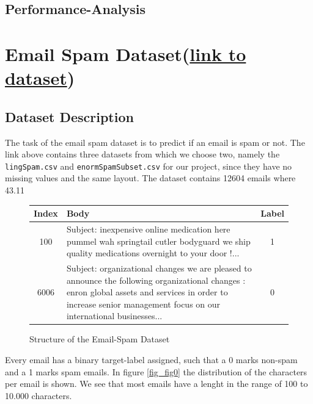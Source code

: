 \documentclass[11pt]{article}
\begin{document}
\subsection{Performance-Analysis}


\section{Email Spam Dataset(\href{https://www.kaggle.com/nitishabharathi/email-spam-dataset}{link to dataset})}


\subsection{Dataset Description}
The task of the email spam dataset is to predict if an email is spam or not. The link above contains three datasets from which we choose two, namely the \texttt{lingSpam.csv} and \texttt{enormSpamSubset.csv} for our project, since they have no missing values and the same layout. The dataset contains 12604 emails where 43.11%

\begin{figure}[h]
  \begin{tabular}{ | c | p{15cm} | c |}
    \hline
    Index & Body & Label \\
    \hline
    100 & 
    Subject: inexpensive online medication here
 pummel wah springtail cutler bodyguard
 we ship quality medications overnight to your door !...
    & 1 \\ \hline
    6006
    &
    Subject: organizational changes
 we are pleased to announce the following organizational changes :
 enron global assets and services
 in order to increase senior management focus on our international businesses... 
    & 0 \\
    \hline
    \end{tabular}
    \caption{Structure of the Email-Spam Dataset}
    \label{tab_spam0}
  \end{figure}
Every email has a binary target-label assigned, such that a 0 marks non-spam and a 1 marks spam emails. In figure \ref{fig_fig0} the distribution of the characters per email is shown. We see that most emails have a lenght in the range of 100 to 10.000 characters.
\end{document}
